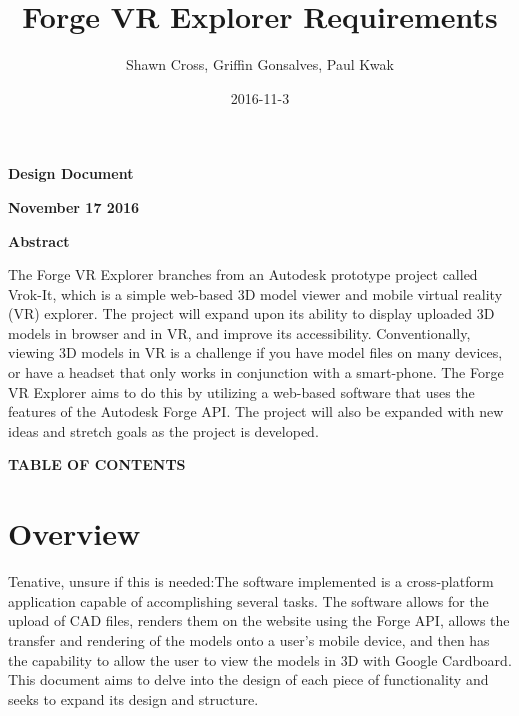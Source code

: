 \documentclass[letterpaper, 10pt, draftclsnofoot, compsoc, onecolumn]{IEEEtran}
\title{Forge VR Explorer Requirements}
\author{Shawn Cross, Griffin Gonsalves, Paul Kwak}
\date{2016-11-3}
\begin{document}
\clearpage\setcounter{page}{1}\pagestyle{Standard}
\thispagestyle{FirstPage}

\bigskip

{\centering{}\bfseries\color{black}
Design Document
\par}


\bigskip

{\centering{}\bfseries\color{black}
November 17 2016
\par}
\bigskip
\bigskip
\bigskip
\bigskip
\bigskip
\bigskip
\bigskip
\bigskip
\bigskip
\bigskip
\bigskip
\bigskip


\vfill
{\centering{}\bfseries\color{black}
Abstract
\par}

{\centering{}\mdseries\color{black}
	The Forge VR Explorer branches from an Autodesk prototype project called Vrok-It, which is a simple web-based 3D 
	model viewer and mobile virtual reality (VR) explorer. The project will expand upon its ability to display uploaded 3D 
	models in browser and in VR, and improve its accessibility. Conventionally, viewing 3D models in VR is a challenge if 
	you have model files on many devices, or have a headset that only works in conjunction with a smart-phone. The 
	Forge VR Explorer aims to do this by utilizing a web-based software that uses the features of the Autodesk Forge API. 
	The project will also be expanded with new ideas and stretch goals as the project is developed.
\par}
\clearpage
{\centering{}\bfseries\color{black}
TABLE OF CONTENTS
\par}

\bigskip

\setcounter{tocdepth}{2}
\renewcommand\contentsname{}
\tableofcontents

\bigskip
\clearpage


\section{Overview}
Tenative, unsure if this is needed:The software implemented is a cross-platform application capable of accomplishing several tasks. The software allows for the upload of CAD files, renders them on the website using the Forge API, allows the transfer and rendering of the models onto a user's mobile device, and then has the capability to allow the user to view the models in 3D with Google Cardboard. This document aims to delve into the design of each piece of functionality and seeks to expand its design and structure.
\end{document}
